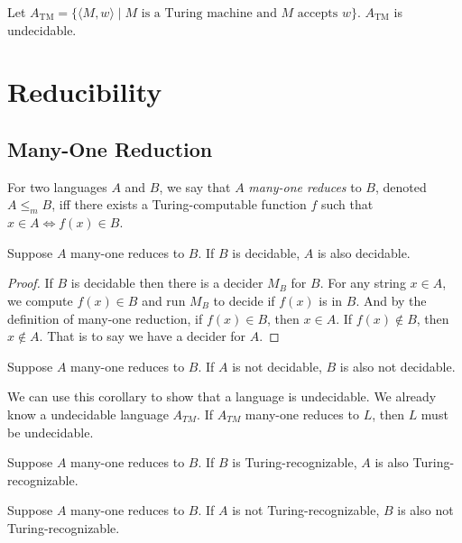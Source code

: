 \documentclass[11pt]{article}
\begin{document}
\begin{theorem}
Let $A_{\mathrm{TM}} = \{\langle M,w \rangle \mid M \text{ is a Turing machine and } M \text{ accepts } w\}$.
$A_{\mathrm{TM}}$ is undecidable.
\end{theorem}

\section{Reducibility}

\subsection{Many-One Reduction}

\begin{definition}
For two languages $A$ and $B$, we say that $A$ \emph{many-one reduces} to $B$, denoted
$A \leq_m B$, iff there exists a Turing-computable function $f$ such that
$x \in A \Leftrightarrow f(x) \in B$.
\end{definition}

\begin{proposition}
Suppose $A$ many-one reduces to $B$. If $B$ is decidable, $A$ is also decidable.
\end{proposition}

\begin{proof}
If $B$ is decidable then there is a decider $M_B$ for $B$. For any string $x \in A$, we compute
$f(x) \in B$ and run $M_B$ to decide if $f(x)$ is in $B$. And by the definition of many-one
reduction, if $f(x) \in B$, then $x \in A$. If $f(x) \not\in B$, then $x \not\in A$. That is to say
we have a decider for $A$.
\end{proof}

\begin{corollary}
Suppose $A$ many-one reduces to $B$. If $A$ is not decidable, $B$ is also not decidable.
\end{corollary}

We can use this corollary to show that a language is undecidable. We already know a undecidable
language $A_{TM}$. If $A_{TM}$ many-one reduces to $L$, then $L$ must be undecidable.

\begin{corollary}
Suppose $A$ many-one reduces to $B$. If $B$ is Turing-recognizable, $A$ is also Turing-recognizable.
\end{corollary}

\begin{corollary}
Suppose $A$ many-one reduces to $B$. If $A$ is not Turing-recognizable, $B$ is also not
Turing-recognizable.
\end{corollary}
\end{document}
